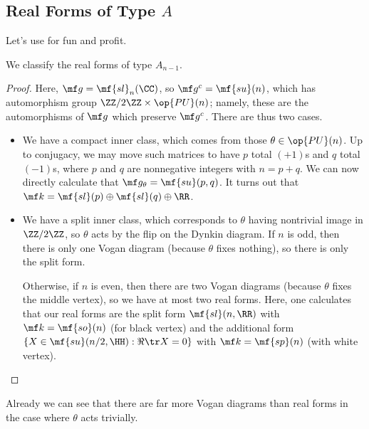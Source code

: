 \documentclass[../notes.tex]{subfiles}
\begin{document}
\subsection{Real Forms of Type \texorpdfstring{$A$}{ A}}
Let's use  for fun and profit.
\begin{exe} \label{exe:real-form-a}
	We classify the real forms of type $A_{n-1}$.
\end{exe}
\begin{proof}
	Here, $\mf g=\mf{sl}_n(\CC)$, so $\mf g^c=\mf{su}(n)$, which has automorphism group $\ZZ/2\ZZ\times\op{PU}(n)$; namely, these are the automorphisms of $\mf g$ which preserve $\mf g^c$. There are thus two cases.
	\begin{itemize}
		\item We have a compact inner class, which comes from those $\theta\in\op{PU}(n)$. Up to conjugacy, we may move such matrices to have $p$ total $(+1)$s and $q$ total $(-1)$s, where $p$ and $q$ are nonnegative integers with $n=p+q$. We can now directly calculate that $\mf g_\theta=\mf{su}(p,q)$. It turns out that $\mf k=\mf{sl}(p)\oplus\mf{sl}(q)\oplus\RR$.

		\item We have a split inner class, which corresponds to $\theta$ having nontrivial image in $\ZZ/2\ZZ$, so $\theta$ acts by the flip on the Dynkin diagram. If $n$ is odd, then there is only one Vogan diagram (because $\theta$ fixes nothing), so there is only the split form.

		Otherwise, if $n$ is even, then there are two Vogan diagrams (because $\theta$ fixes the middle vertex), so we have at most two real forms. Here, one calculates that our real forms are the split form $\mf{sl}(n,\RR)$ with $\mf k=\mf{so}(n)$ (for black vertex) and the additional form $\{X\in\mf{su}(n/2,\HH):\Re\tr X=0\}$ with $\mf k=\mf{sp}(n)$ (with white vertex).
		\qedhere
	\end{itemize}
\end{proof}
\begin{remark}
	Already we can see that there are far more Vogan diagrams than real forms in the case where $\theta$ acts trivially.
\end{remark}
\end{document}
